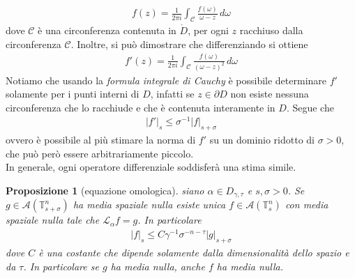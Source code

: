 \documentclass[twoside, 11pt]{amsbook}
\newcommand{\0}{{(0)}}
\newcommand{\3}{{(3)}}
\theoremstyle{colonplain}
\newtheorem{prop}[thm]{Proposizione}
\theoremstyle{colondefinition}
\theoremstyle{colonremark}
\numberwithin{equation}{chapter}
\begin{document}
\begin{align}
    f(z) = \frac{1}{2\pi i}\int_{\mathcal{C}} \frac{f(\omega)}{\omega - z} \, d\omega
\end{align}
dove $\mathcal{C}$ è una circonferenza contenuta in $\mathring{D}$, per ogni $z$ racchiuso dalla circonferenza $\mathcal{C}$. Inoltre, si può dimostrare che differenziando si ottiene
\begin{align}
    f'(z) = \frac{1}{2\pi i}\int_{\mathcal{C}} \frac{f(\omega)}{(\omega - z)^2} \, d\omega
\end{align}
Notiamo che usando la \textit{formula integrale di Cauchy} è possibile determinare $f'$ solamente per i punti interni di $D$, infatti se $z \in \partial D$ non esiste nessuna circonferenza che lo racchiude e che è contenuta interamente in $D$. Segue che
\begin{align}
    |f'|_s \leq \sigma^{-1}|f|_{s + \sigma}
\end{align}
ovvero è possibile al più stimare la norma di $f'$ su un dominio ridotto di $\sigma > 0$, che può però essere arbitrariamente piccolo. \\
In generale, ogni operatore differenziale soddisferà una stima simile.
\begin{prop}[equazione omologica]\label{HomEq&CauchyEst} siano $\alpha \in D_{\gamma, \tau}$ e $s, \sigma > 0$. Se $g \in \mathcal{A}(\mathbb{T}^n_{s + \sigma})$ ha media spaziale nulla esiste unica $f \in \mathcal{A}(\mathbb{T}^n_s)$ con media spaziale nulla tale che $\mathcal{L}_\alpha f = g$. In particolare
\begin{align}
    |f|_s \leq C\gamma^{-1}\sigma^{-n-\tau}|g|_{s + \sigma}
\end{align}
dove $C$ è una costante che dipende solamente dalla dimensionalità dello spazio e da $\tau$. In particolare se $g$ ha media nulla, anche $f$ ha media nulla.
\end{prop}
\end{document}
